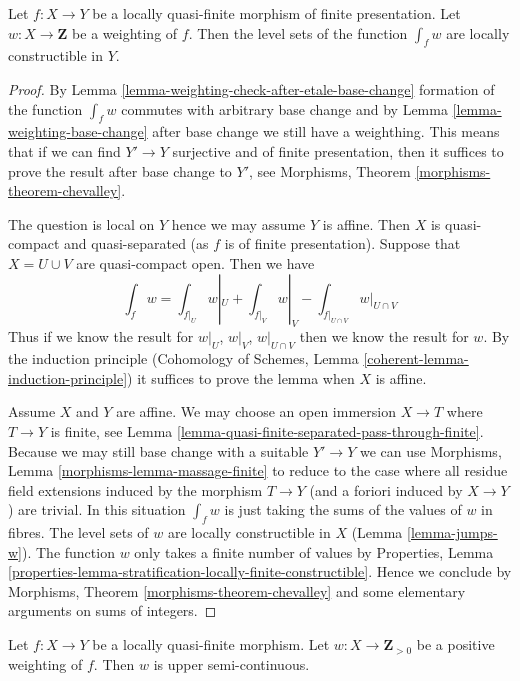 \begin{lemma}
\label{lemma-jumps-int-w}
Let $f : X \to Y$ be a locally quasi-finite morphism of finite
presentation. Let $w : X \to \mathbf{Z}$ be a weighting of $f$. Then
the level sets of the function $\int_f w$ are locally constructible in $Y$.
\end{lemma}

\begin{proof}
By Lemma \ref{lemma-weighting-check-after-etale-base-change}
formation of the function $\int_f w$ commutes with arbitrary
base change and by Lemma \ref{lemma-weighting-base-change}
after base change we still have a weighthing.
This means that if we can find $Y' \to Y$
surjective and of finite presentation, then it
suffices to prove the result after base change to $Y'$, see
Morphisms, Theorem \ref{morphisms-theorem-chevalley}.

\medskip\noindent
The question is local on $Y$ hence we may assume $Y$ is affine.
Then $X$ is quasi-compact and quasi-separated
(as $f$ is of finite presentation). Suppose that $X = U \cup V$
are quasi-compact open. Then we have
$$
\textstyle{\int}_f w =
\textstyle{\int}_{f|_U} w|_U +
\textstyle{\int}_{f|_V} w|_V -
\textstyle{\int}_{f|_{U \cap V}} w|_{U \cap V}
$$
Thus if we know the result for $w|_U$, $w|_V$, $w|_{U \cap V}$
then we know the result for $w$. By the induction principle
(Cohomology of Schemes, Lemma \ref{coherent-lemma-induction-principle})
it suffices to prove the lemma when $X$ is affine.

\medskip\noindent
Assume $X$ and $Y$ are affine. We may choose an open immersion
$X \to T$ where $T \to Y$ is finite, see
Lemma \ref{lemma-quasi-finite-separated-pass-through-finite}.
Because we may still base change with a suitable $Y' \to Y$
we can use Morphisms, Lemma \ref{morphisms-lemma-massage-finite}
to reduce to the case where
all residue field extensions induced by the morphism $T \to Y$
(and a foriori induced by $X \to Y$) are trivial.
In this situation $\int_f w$ is just taking the sums
of the values of $w$ in fibres. The level sets of $w$
are locally constructible in $X$ (Lemma \ref{lemma-jumps-w}).
The function $w$ only takes a finite number of values by
Properties, Lemma
\ref{properties-lemma-stratification-locally-finite-constructible}.
Hence we conclude by
Morphisms, Theorem \ref{morphisms-theorem-chevalley}
and some elementary arguments on sums of integers.
\end{proof}

\begin{lemma}
\label{lemma-semicontinuous-w}
Let $f : X \to Y$ be a locally quasi-finite morphism.
Let $w : X \to \mathbf{Z}_{> 0}$ be a positive weighting of $f$.
Then $w$ is upper semi-continuous.
\end{lemma}

